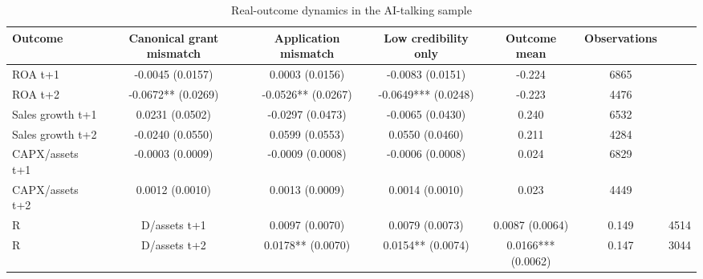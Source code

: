 \begin{table}[!htbp]
\centering
\caption{Real-outcome dynamics in the AI-talking sample}
\begin{tabular}{lccccc}
\hline
Outcome & Canonical grant mismatch & Application mismatch & Low credibility only & Outcome mean & Observations \\
\hline
ROA t+1 & -0.0045 (0.0157) & 0.0003 (0.0156) & -0.0083 (0.0151) & -0.224 & 6865 \\
ROA t+2 & -0.0672** (0.0269) & -0.0526** (0.0267) & -0.0649*** (0.0248) & -0.223 & 4476 \\
Sales growth t+1 & 0.0231 (0.0502) & -0.0297 (0.0473) & -0.0065 (0.0430) & 0.240 & 6532 \\
Sales growth t+2 & -0.0240 (0.0550) & 0.0599 (0.0553) & 0.0550 (0.0460) & 0.211 & 4284 \\
CAPX/assets t+1 & -0.0003 (0.0009) & -0.0009 (0.0008) & -0.0006 (0.0008) & 0.024 & 6829 \\
CAPX/assets t+2 & 0.0012 (0.0010) & 0.0013 (0.0009) & 0.0014 (0.0010) & 0.023 & 4449 \\
R&D/assets t+1 & 0.0097 (0.0070) & 0.0079 (0.0073) & 0.0087 (0.0064) & 0.149 & 4514 \\
R&D/assets t+2 & 0.0178** (0.0070) & 0.0154** (0.0074) & 0.0166*** (0.0062) & 0.147 & 3044 \\
\hline
\end{tabular}
\end{table}
